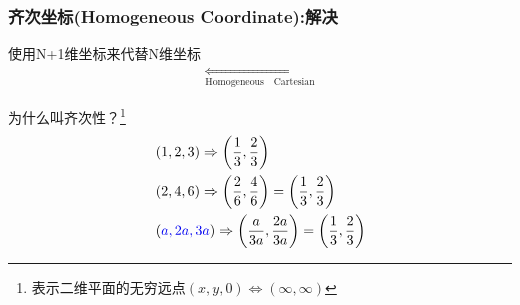 \documentclass[aspectratio=43]{beamer}
\begin{document}
	\begin{frame}
	\frametitle{齐次坐标(Homogeneous Coordinate):解决}
	\begin{block}{使用N+1维坐标来代替N维坐标}
	\begin{equation*}
	\begin{aligned}
				\mathop {\left( x,y,w \right) \Longleftrightarrow \left( \frac{x}{w},\frac{y}{w} \right)} \limits_{\mathrm{Homogeneous}    \quad        \mathrm{Cartesian}}			
	\end{aligned}
	\end{equation*}
	\end{block}
	\begin{exampleblock}{为什么叫齐次性？\footnote{表示二维平面的无穷远点$\left( x,y,0 \right) \Longleftrightarrow \left( \infty ,\infty \right) $}}
	\begin{equation*}
	\begin{aligned}
	&	\left( 1,2,3 \right) \Rightarrow \left( \frac{1}{3},\frac{2}{3} \right) 
		\\
	&	\left( 2,4,6 \right) \Rightarrow \left( \frac{2}{6},\frac{4}{6} \right) =\left( \frac{1}{3},\frac{2}{3} \right) 
		\\
	&	\left( {\color[RGB]{0, 0, 240} a,2a,3a} \right) \Rightarrow \left( \frac{a}{3a},\frac{2a}{3a} \right) =\left( \frac{1}{3},\frac{2}{3} \right) 
	\end{aligned}	
	\end{equation*}
	\end{exampleblock}

	\end{frame}
\end{document}
